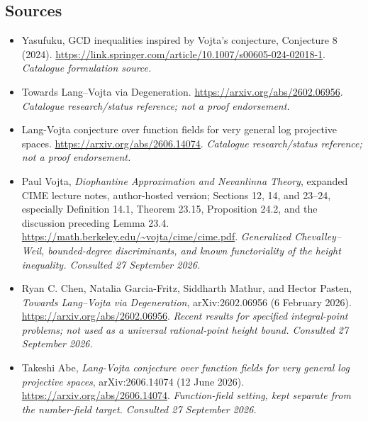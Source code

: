 \documentclass[11pt,a4paper]{article}
\numberwithin{equation}{section}
\begin{document}
\subsection{Sources}
\begin{itemize}\raggedright
\item[\textnormal{[S1]}]\hypertarget{source:statement:1}{} Yasufuku, GCD inequalities inspired by Vojta's conjecture, Conjecture 8 (2024).
\url{https://link.springer.com/article/10.1007/s00605-024-02018-1}.
{\small\textit{Catalogue formulation source.}}
\item[\textnormal{[S2]}]\hypertarget{source:statement:2}{} Towards Lang--Vojta via Degeneration.
\url{https://arxiv.org/abs/2602.06956}.
{\small\textit{Catalogue research/status reference; not a proof endorsement.}}
\item[\textnormal{[S3]}]\hypertarget{source:statement:3}{} Lang-Vojta conjecture over function fields for very general log projective spaces.
\url{https://arxiv.org/abs/2606.14074}.
{\small\textit{Catalogue research/status reference; not a proof endorsement.}}

\item[\textnormal{[E1]}]\hypertarget{extra:statement:1}{} Paul Vojta, \emph{Diophantine Approximation and Nevanlinna Theory}, expanded CIME lecture notes, author-hosted version; Sections 12, 14, and 23--24, especially Definition 14.1, Theorem 23.15, Proposition 24.2, and the discussion preceding Lemma 23.4.
\url{https://math.berkeley.edu/~vojta/cime/cime.pdf}.
{\small\textit{Generalized Chevalley--Weil, bounded-degree discriminants, and known functoriality of the height inequality. Consulted 27 September 2026.}}
\item[\textnormal{[E2]}]\hypertarget{extra:statement:2}{} Ryan C. Chen, Natalia Garcia-Fritz, Siddharth Mathur, and Hector Pasten, \emph{Towards Lang--Vojta via Degeneration}, arXiv:2602.06956 (6 February 2026).
\url{https://arxiv.org/abs/2602.06956}.
{\small\textit{Recent results for specified integral-point problems; not used as a universal rational-point height bound. Consulted 27 September 2026.}}
\item[\textnormal{[E3]}]\hypertarget{extra:statement:3}{} Takeshi Abe, \emph{Lang-Vojta conjecture over function fields for very general log projective spaces}, arXiv:2606.14074 (12 June 2026).
\url{https://arxiv.org/abs/2606.14074}.
{\small\textit{Function-field setting, kept separate from the number-field target. Consulted 27 September 2026.}}
\end{itemize}
\end{document}
